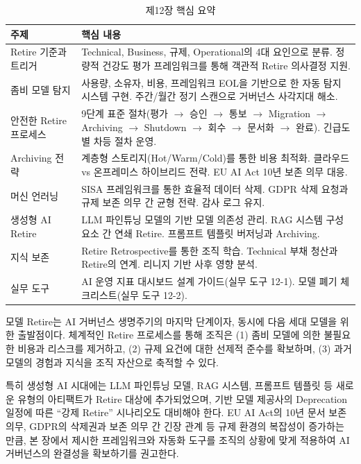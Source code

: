 \begin{table}[htbp]
\centering
\caption{제12장 핵심 요약}
\label{tab:ch12_summary}
\begin{tabularx}{\textwidth}{p{3.5cm}X}
\toprule
\textbf{주제} & \textbf{핵심 내용} \\
\midrule
Retire 기준과 트리거 &
Technical, Business, 규제, Operational의 4대 요인으로 분류. 정량적 건강도 평가 프레임워크를 통해 객관적 Retire 의사결정 지원. \\
\midrule
좀비 모델 탐지 &
사용량, 소유자, 비용, 프레임워크 EOL을 기반으로 한 자동 탐지 시스템 구현. 주간/월간 정기 스캔으로 거버넌스 사각지대 해소. \\
\midrule
안전한 Retire 프로세스 &
9단계 표준 절차(평가 $\rightarrow$ 승인 $\rightarrow$ 통보 $\rightarrow$ Migration $\rightarrow$ Archiving $\rightarrow$ Shutdown $\rightarrow$ 회수 $\rightarrow$ 문서화 $\rightarrow$ 완료). 긴급도별 차등 절차 운영. \\
\midrule
Archiving 전략 &
계층형 스토리지(Hot/Warm/Cold)를 통한 비용 최적화. 클라우드 vs 온프레미스 하이브리드 전략. EU AI Act 10년 보존 의무 대응. \\
\midrule
머신 언러닝 &
SISA 프레임워크를 통한 효율적 데이터 삭제. GDPR 삭제 요청과 규제 보존 의무 간 균형 전략. 감사 로그 유지. \\
\midrule
생성형 AI Retire &
LLM 파인튜닝 모델의 기반 모델 의존성 관리. RAG 시스템 구성요소 간 연쇄 Retire. 프롬프트 템플릿 버저닝과 Archiving. \\
\midrule
지식 보존 &
Retire Retrospective를 통한 조직 학습. Technical 부채 청산과 Retire의 연계. 리니지 기반 사후 영향 분석. \\
\midrule
실무 도구 &
AI 운영 지표 대시보드 설계 가이드(실무 도구 12-1). 모델 폐기 체크리스트(실무 도구 12-2). \\
\bottomrule
\end{tabularx}
\end{table}

모델 Retire는 AI 거버넌스 생명주기의 마지막 단계이자, 동시에 다음 세대 모델을 위한 출발점이다. 체계적인 Retire 프로세스를 통해 조직은 (1) 좀비 모델에 의한 불필요한 비용과 리스크를 제거하고, (2) 규제 요건에 대한 선제적 준수를 확보하며, (3) 과거 모델의 경험과 지식을 조직 자산으로 축적할 수 있다.

특히 생성형 AI 시대에는 LLM 파인튜닝 모델, RAG 시스템, 프롬프트 템플릿 등 새로운 유형의 아티팩트가 Retire 대상에 추가되었으며, 기반 모델 제공사의 Deprecation 일정에 따른 ``강제 Retire'' 시나리오도 대비해야 한다. EU AI Act의 10년 문서 보존 의무, GDPR의 삭제권과 보존 의무 간 긴장 관계 등 규제 환경의 복잡성이 증가하는 만큼, 본 장에서 제시한 프레임워크와 자동화 도구를 조직의 상황에 맞게 적용하여 AI 거버넌스의 완결성을 확보하기를 권고한다.

